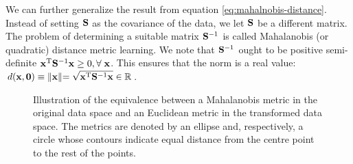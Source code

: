 We can further generalize the result from equation \eqref{eq:mahalnobis-distance}.
Instead of setting $\mathbf{S}$ as the covariance of the data, we let $\mathbf{S}$ be a different matrix. The problem of determining a suitable matrix
$\mathbf{S}^{-1}$ is called Mahalanobis (or quadratic) distance metric learning. We note that $\mathbf{S}^{-1}$ ought to be positive semi-definite $\mathbf{x}^\textrm{T}\mathbf{S}^{-1}\mathbf{x} \geq 0, \forall\;\mathbf{x}$. This ensures that the norm is a real value: $d(\mathbf{x},\mathbf{0})\equiv\lVert \mathbf{x}\lVert = \sqrt{\mathbf{x}^\textrm{T}\mathbf{S}^{-1}\mathbf{x}}\in\mathbb{R}$.



\begin{figure}
		 \centering
			    \hspace{0.02\textwidth}
		\caption[Equivalence between the Mahalanobis metric and its associated linear projection]{Illustration of the equivalence between a Mahalanobis metric in the original data space and an Euclidean metric in the transformed data space. The metrics are denoted by an ellipse and, respectively, a circle whose contours indicate equal distance from the centre point to the rest of the points.}
		\label{fig:mahalanobis-euclidean}
	\end{figure}

